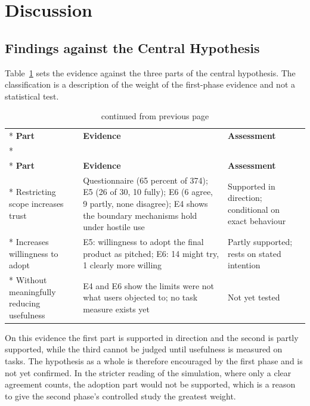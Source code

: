 \documentclass{FastFyp}
\begin{document}
\section{Discussion}
\subsection{Findings against the Central Hypothesis}
Table~\ref{tab:hyp} sets the evidence against the three parts of the central hypothesis. The classification is a description of the weight of the first-phase evidence and not a statistical test.

{
\begin{longtable}{|p{3.0cm}|p{7.2cm}|p{2.9cm}|}
\caption{Assessment of the central hypothesis.}\label{tab:hyp}\\*
\hline
\textbf{Part} & \textbf{Evidence} & \textbf{Assessment} \\*
\hline
\endfirsthead
\caption[]{continued from previous page}\\*
\hline
\textbf{Part} & \textbf{Evidence} & \textbf{Assessment} \\*
\hline
\endhead
\hline
Restricting scope increases trust & Questionnaire (65 percent of 374); E5 (26 of 30, 10 fully); E6 (6 agree, 9 partly, none disagree); E4 shows the boundary mechanisms hold under hostile use & Supported in direction; conditional on exact behaviour \\*
\hline
Increases willingness to adopt & E5: willingness to adopt the final product as pitched; E6: 14 might try, 1 clearly more willing & Partly supported; rests on stated intention \\*
\hline
Without meaningfully reducing usefulness & E4 and E6 show the limits were not what users objected to; no task measure exists yet & Not yet tested \\
\hline
\end{longtable}
}

On this evidence the first part is supported in direction and the second is partly supported, while the third cannot be judged until usefulness is measured on tasks. The hypothesis as a whole is therefore encouraged by the first phase and is not yet confirmed. In the stricter reading of the simulation, where only a clear agreement counts, the adoption part would not be supported, which is a reason to give the second phase's controlled study the greatest weight.
\end{document}
